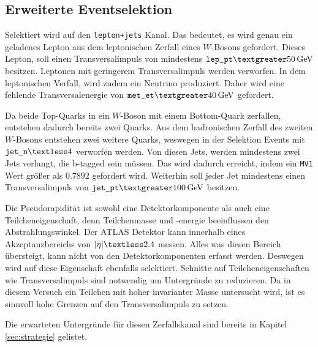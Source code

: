 \subsection{Erweiterte Eventselektion}

Selektiert wird auf den \texttt{lepton+jets} Kanal. Das bedeutet, es wird genau 
ein geladenes Lepton aus dem leptonischen Zerfall eines $W$-Bosons gefordert. 
Dieses Lepton, soll einen Transversalimpuls von mindestens $\texttt{lep$\_$pt} \textgreater 
\SI{50}{\giga\electronvolt}$ besitzen. Leptonen mit geringerem Transversalimpuls 
werden verworfen. In dem leptonischen Verfall, wird zudem ein 
Neutrino produziert. Daher wird eine fehlende Transversalenergie von 
$\texttt{met$\_$et} \textgreater \SI{40}{\giga\electronvolt}$ gefordert. \par 
Da beide Top-Quarks in ein $W$-Boson mit einem Bottom-Quark zerfallen, entstehen
dadurch bereits zwei Quarks. Aus dem hadronischen Zerfall des zweiten $W$-Bosons 
entstehen zwei weitere Quarks, weswegen in der Selektion Events mit 
$\texttt{jet$\_$n} \textless 4$ verworfen werden. Von diesen Jets, werden 
mindestens zwei Jets verlangt, die b-tagged sein müssen. Das wird dadurch erreicht,
indem ein \texttt{MV1} Wert größer als $0.7892$ gefordert wird. Weiterhin soll 
jeder Jet mindestens einen Transversalimpuls von $\texttt{jet$\_$pt} 
\textgreater \SI{100}{\giga\electronvolt}$ besitzen. \par 
Die Pseudorapidität ist sowohl eine Detektorkomponente als auch eine 
Teilcheneigenschaft, denn Teilchenmasse und -energie beeinflussen den 
Abstrahlungswinkel. Der ATLAS Detektor kann innerhalb eines Akzeptanzbereichs 
von $|{\eta}| \textless 2.4$ messen. Alles was diesen Bereich übersteigt, 
kann nicht von den Detektorkomponenten erfasst werden. Deswegen wird auf 
diese Eigenschaft ebenfalls selektiert. Schnitte auf Teilcheneigenschaften 
wie Transversalimpuls sind notwendig um Untergründe zu reduzieren. Da in diesem 
Versuch ein Teilchen mit hoher invarianter Masse untersucht wird, ist es 
sinnvoll hohe Grenzen auf den Transversalimpuls zu setzen. \par 

Die erwarteten Untergründe für diesen Zerfallskanal sind bereits in 
Kapitel \ref{sec:strategie} gelistet.